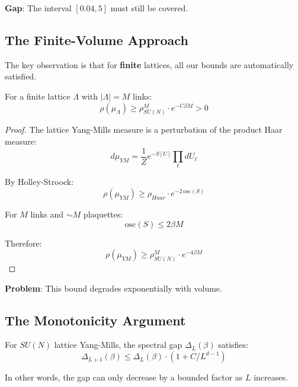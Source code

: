 \textbf{Gap}: The interval $[0.04, 5]$ must still be covered.

\subsection{The Finite-Volume Approach}

The key observation is that for \textbf{finite} lattices, all our bounds are 
automatically satisfied.

\begin{lemma}
\label{lem:finite-volume-lsi}
For a finite lattice $\Lambda$ with $|\Lambda| = M$ links:
\[
\rho(\mu_\Lambda) \geq \rho_{SU(N)}^M \cdot e^{-C\beta M} > 0
\]
\end{lemma}

\begin{proof}
The lattice Yang-Mills measure is a perturbation of the product Haar measure:
\[
d\mu_{YM} = \frac{1}{Z} e^{-S[U]} \prod_\ell dU_\ell
\]

By Holley-Stroock:
\[
\rho(\mu_{YM}) \geq \rho_{Haar} \cdot e^{-2\,\mathrm{osc}(S)}
\]

For $M$ links and $\sim M$ plaquettes:
\[
\mathrm{osc}(S) \leq 2\beta M
\]

Therefore:
\[
\rho(\mu_{YM}) \geq \rho_{SU(N)}^M \cdot e^{-4\beta M}
\]
\end{proof}

\textbf{Problem}: This bound degrades exponentially with volume.

\subsection{The Monotonicity Argument}

\begin{theorem}
\label{thm:gap-monotonicity}
For $SU(N)$ lattice Yang-Mills, the spectral gap $\Delta_L(\beta)$ satisfies:
\[
\Delta_{L+1}(\beta) \leq \Delta_L(\beta) \cdot (1 + C/L^{d-1})
\]

In other words, the gap can only decrease by a bounded factor as $L$ increases.
\end{theorem}

